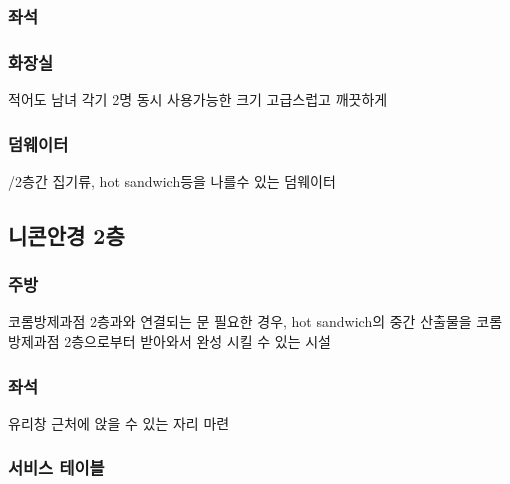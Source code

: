 \documentclass{myproc}
\begin{document}
\subsubsection{좌석}

\subsubsection{화장실}
\bit
\w 적어도 남녀 각기 2명 동시 사용가능한 크기
\w 고급스럽고 깨끗하게
\eit

\subsubsection{덤웨이터}
\bit
{}/2층간 집기류, hot sandwich등을 나를수 있는 덤웨이터
\eit

\subsection{니콘안경 2층}
\subsubsection{주방}
\bit
\w 코롬방제과점 2층과와 연결되는 문
\w 필요한 경우, hot sandwich의 중간 산출물을 코롬방제과점 2층으로부터 받아와서
완성 시킬 수 있는 시설
\eit

\subsubsection{좌석}
\bit
\w 유리창 근처에 앉을 수 있는 자리 마련
\eit

\subsubsection{서비스 테이블}




\vspace*{2cm}

\tableofcontents
\end{document}
